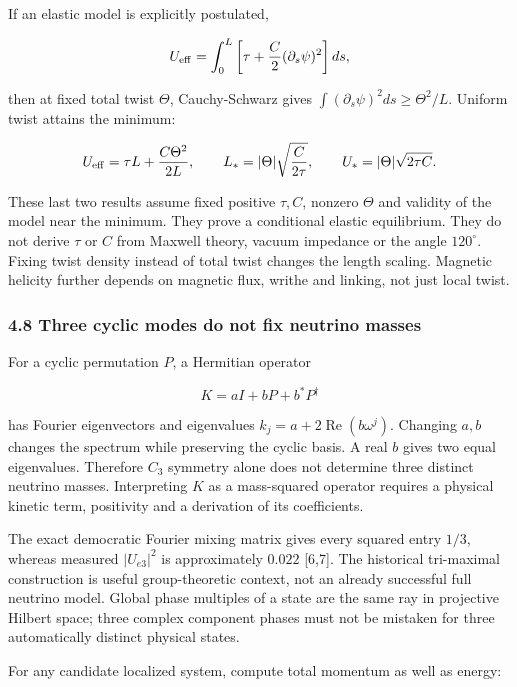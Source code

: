 \documentclass[
  11pt,
]{article}
\begin{document}
If an elastic model is explicitly postulated,

\[
U_{\rm eff}=\int_0^L\left[\tau+\frac C2(\partial_s\psi)^2\right]ds,
\]

then at fixed total twist \(\Theta\), Cauchy-Schwarz gives
\(\int(\partial_s\psi)^2ds\ge\Theta^2/L\). Uniform twist attains the
minimum:

\[
U_{\rm eff}=\tau L+\frac{C\Theta^2}{2L},\qquad
L_* = |\Theta|\sqrt{\frac{C}{2\tau}},\qquad
U_* = |\Theta|\sqrt{2\tau C}.
\]

These last two results assume fixed positive \(\tau,C\), nonzero
\(\Theta\) and validity of the model near the minimum. They prove a
conditional elastic equilibrium. They do not derive \(\tau\) or \(C\)
from Maxwell theory, vacuum impedance or the angle \(120^\circ\). Fixing
twist density instead of total twist changes the length scaling.
Magnetic helicity further depends on magnetic flux, writhe and linking,
not just local twist.

\hypertarget{three-cyclic-modes-do-not-fix-neutrino-masses}{%
\subsubsection{4.8 Three cyclic modes do not fix neutrino
masses}\label{three-cyclic-modes-do-not-fix-neutrino-masses}}

For a cyclic permutation \(P\), a Hermitian operator

\[
K=aI+bP+b^*P^\dagger
\]

has Fourier eigenvectors and eigenvalues
\(k_j=a+2\operatorname{Re}(b\omega^j)\). Changing \(a,b\) changes the
spectrum while preserving the cyclic basis. A real \(b\) gives two equal
eigenvalues. Therefore \(C_3\) symmetry alone does not determine three
distinct neutrino masses. Interpreting \(K\) as a mass-squared operator
requires a physical kinetic term, positivity and a derivation of its
coefficients.

The exact democratic Fourier mixing matrix gives every squared entry
\(1/3\), whereas measured \(|U_{e3}|^2\) is approximately \(0.022\)
{[}6,7{]}. The historical tri-maximal construction is useful
group-theoretic context, not an already successful full neutrino model.
Global phase multiples of a state are the same ray in projective Hilbert
space; three complex component phases must not be mistaken for three
automatically distinct physical states.

For any candidate localized system, compute total momentum as well as
energy:
\end{document}
